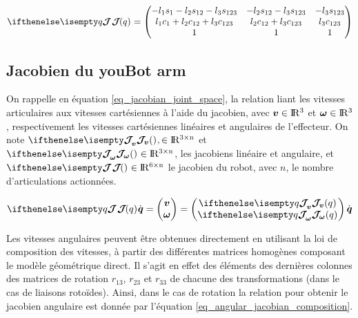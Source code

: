 \begin{appendices}
	\begin{equation} \label{eq_jacobian_detailed}
		\jacobian{q}{}{} = 
		\begin{pmatrix}
			-l_1 s_1 - l_2 s_{12} - l_3 s_{123} & -l_2 s_{12} - l_3 s_{123}  & -l_3 s_{123} \\
			l_1 c_1 + l_2 c_{12} + l_3 c_{123} & l_2 c_{12} + l_3 c_{123}  & l_3 c_{123} \\
			1 & 1 & 1 \\
		\end{pmatrix}
	\end{equation}
	
	\subsection{Jacobien du youBot arm} \label{app_jacobian_sub_5}
	
	On rappelle en équation \cref{eq_jacobian_joint_space}, la relation liant les vitesses articulaires aux vitesses cartésiennes à l'aide du jacobien, avec $ \vect{v} \in \R^3 $ et $ \vect{\omega} \in \R^3 $, respectivement les vitesses cartésiennes linéaires et angulaires de l'effecteur. On note $ \jacobian{}{v}{}, \in \R^{3\times n} $ et $ \jacobian{}{\omega}{} \in \R^{3\times n} $, les jacobiens linéaire et angulaire, et $ \jacobian{}{}{} \in \R^{6\times n} $ le jacobien du robot, avec $ n $, le nombre d'articulations actionnées. 
	
	\begin{equation} \label{eq_jacobian_joint_space}
		\jacobian{q}{}{} \dot{\vect{q}} = \begin{pmatrix} \vect{v} \\ \vect{\omega} \end{pmatrix} = \begin{pmatrix} \jacobian{q}{v}{} \\ \jacobian{q}{\omega}{} \end{pmatrix} \dot{\vect{q}}
	\end{equation}
	
	Les vitesses angulaires peuvent être obtenues directement en utilisant la loi de composition des vitesses, à partir des différentes matrices homogènes composant le modèle géométrique direct. Il s'agit en effet des éléments des dernières colonnes des matrices de rotation $r_{13} $, $ r_{23} $ et $ r_{33} $ de chacune des transformations (dans le cas de liaisons rotoïdes). Ainsi, dans le cas de rotation la relation pour obtenir le jacobien angulaire est donnée par l'équation \cref{eq_angular_jacobian_composition}.
	

\end{appendices}
